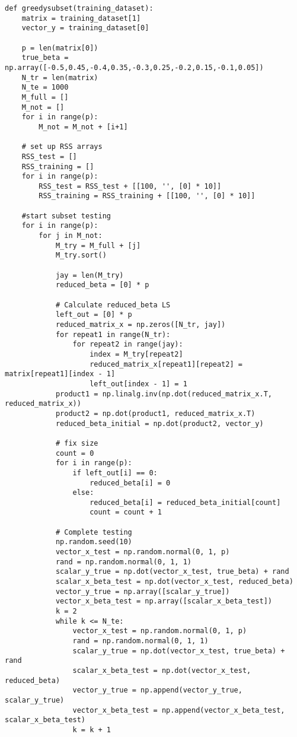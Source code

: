 \documentclass{article}
\begin{document}
\begin{lstlisting}
def greedysubset(training_dataset):
    matrix = training_dataset[1]
    vector_y = training_dataset[0]

    p = len(matrix[0])
    true_beta = np.array([-0.5,0.45,-0.4,0.35,-0.3,0.25,-0.2,0.15,-0.1,0.05])
    N_tr = len(matrix)
    N_te = 1000
    M_full = []
    M_not = []
    for i in range(p):
        M_not = M_not + [i+1]

    # set up RSS arrays
    RSS_test = []
    RSS_training = []
    for i in range(p):
        RSS_test = RSS_test + [[100, '', [0] * 10]]
        RSS_training = RSS_training + [[100, '', [0] * 10]]

    #start subset testing
    for i in range(p):
        for j in M_not:
            M_try = M_full + [j]
            M_try.sort()

            jay = len(M_try)
            reduced_beta = [0] * p

            # Calculate reduced_beta LS
            left_out = [0] * p
            reduced_matrix_x = np.zeros([N_tr, jay])
            for repeat1 in range(N_tr):
                for repeat2 in range(jay):
                    index = M_try[repeat2]
                    reduced_matrix_x[repeat1][repeat2] = matrix[repeat1][index - 1]
                    left_out[index - 1] = 1
            product1 = np.linalg.inv(np.dot(reduced_matrix_x.T, reduced_matrix_x))
            product2 = np.dot(product1, reduced_matrix_x.T)
            reduced_beta_initial = np.dot(product2, vector_y)

            # fix size
            count = 0
            for i in range(p):
                if left_out[i] == 0:
                    reduced_beta[i] = 0
                else:
                    reduced_beta[i] = reduced_beta_initial[count]
                    count = count + 1

            # Complete testing
            np.random.seed(10)
            vector_x_test = np.random.normal(0, 1, p)
            rand = np.random.normal(0, 1, 1)
            scalar_y_true = np.dot(vector_x_test, true_beta) + rand
            scalar_x_beta_test = np.dot(vector_x_test, reduced_beta)
            vector_y_true = np.array([scalar_y_true])
            vector_x_beta_test = np.array([scalar_x_beta_test])
            k = 2
            while k <= N_te:
                vector_x_test = np.random.normal(0, 1, p)
                rand = np.random.normal(0, 1, 1)
                scalar_y_true = np.dot(vector_x_test, true_beta) + rand
                scalar_x_beta_test = np.dot(vector_x_test, reduced_beta)
                vector_y_true = np.append(vector_y_true, scalar_y_true)
                vector_x_beta_test = np.append(vector_x_beta_test, scalar_x_beta_test)
                k = k + 1


\end{lstlisting}
\end{document}
